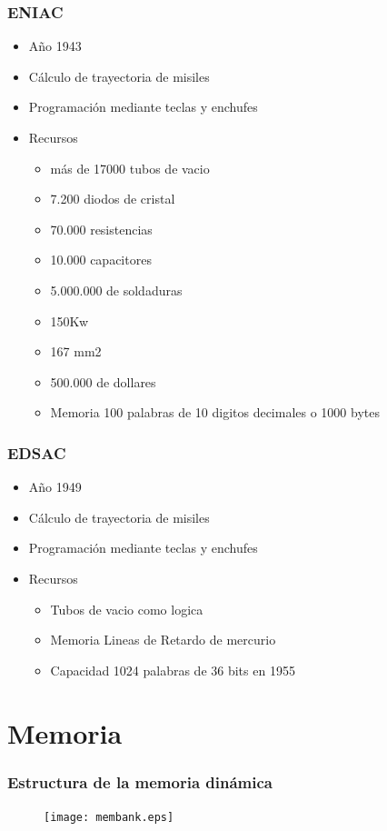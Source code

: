 \documentclass{beamer}
\begin{document}
\begin{frame}
\frametitle{ENIAC}
\begin{itemize}
	\item Año 1943
	\item Cálculo de trayectoria de misiles
	\item Programación mediante teclas y enchufes
	\item Recursos
		\begin{itemize}
			\item más de 17000 tubos de vacio
			\item 7.200 diodos de cristal
			\item 70.000 resistencias
			\item 10.000 capacitores
			\item 5.000.000 de soldaduras
			\item 150Kw
			\item 167 mm2
			\item 500.000 de dollares
			\item Memoria 100 palabras de 10 digitos decimales o 1000 bytes
		\end{itemize}
\end{itemize}
\end{frame}

\begin{frame}
\frametitle{EDSAC}
\begin{itemize}
	\item Año 1949
	\item Cálculo de trayectoria de misiles
	\item Programación mediante teclas y enchufes
	\item Recursos
		\begin{itemize}
			\item Tubos de vacio como logica
			\item Memoria Lineas de Retardo de mercurio
			\item Capacidad 1024 palabras de 36 bits en 1955
		\end{itemize}
\end{itemize}
\end{frame}

\section{Memoria}
\begin{frame}
\frametitle{Estructura de la  memoria dinámica}
\begin{figure}[!htb]
\centering
\texttt{[image: membank.eps]}
\end{figure}
\end{frame}
\end{document}
